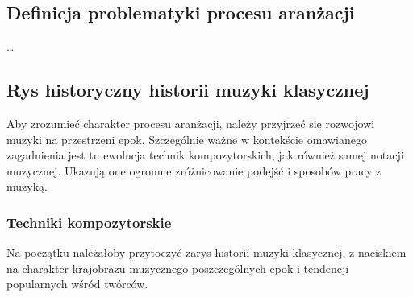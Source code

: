 \documentclass[12pt]{article}
\begin{document}
\subsection{Definicja problematyki procesu aranżacji}
…

\subsection{Rys historyczny historii muzyki klasycznej}
Aby zrozumieć charakter procesu aranżacji, należy przyjrzeć się rozwojowi muzyki na przestrzeni epok.
Szczególnie ważne w kontekście omawianego zagadnienia jest tu ewolucja technik kompozytorskich, jak również samej
notacji muzycznej. Ukazują one ogromne zróżnicowanie podejść i sposobów pracy z muzyką.

\subsubsection{Techniki kompozytorskie}
Na początku należałoby przytoczyć zarys historii muzyki klasycznej, z naciskiem na charakter krajobrazu muzycznego
poszczególnych epok i tendencji popularnych wśród twórców.
\end{document}
